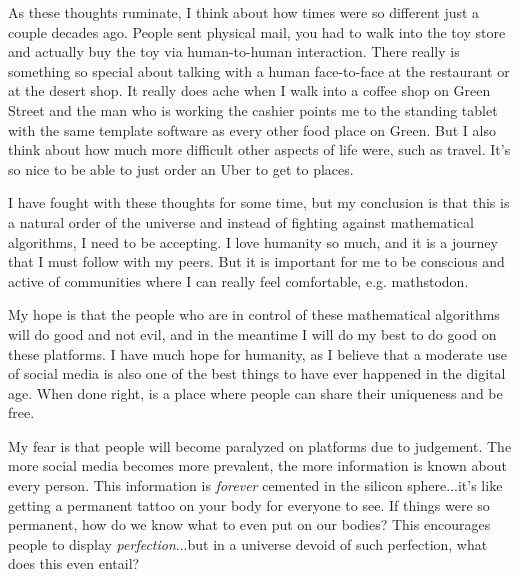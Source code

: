 \documentclass[12pt]{article}
\theoremstyle{definition} %
\theoremstyle{plain} %
\begin{document}
As these thoughts ruminate, I think about how times were so different just a couple decades ago. People sent physical mail, you had to walk into the toy store and actually buy the toy via human-to-human interaction. There really is something so special about talking with a human face-to-face at the restaurant or at the desert shop. It really does ache when I walk into a coffee shop on Green Street and the man who is working the cashier points me to the standing tablet with the same template software as every other food place on Green. But I also think about how much more difficult other aspects of life were, such as travel. It's so nice to be able to just order an Uber to get to places. 

I have fought with these thoughts for some time, but my conclusion is that this is a natural order of the universe and instead of fighting against mathematical algorithms, I need to be accepting. I love humanity so much, and it is a journey that I must follow with my peers. But it is important for me to be conscious and active of communities where I can really feel comfortable, e.g. mathstodon. 

My hope is that the people who are in control of these mathematical algorithms will do good and not evil, and in the meantime I will do my best to do good on these platforms. I have much hope for humanity, as I believe that a moderate use of social media is also one of the best things to have ever happened in the digital age. When done right, is a place where people can share their uniqueness and be free. 

My fear is that people will become paralyzed on platforms due to judgement. The more social media becomes more prevalent, the more information is known about every person. This information is \emph{forever} cemented in the silicon sphere...it's like getting a permanent tattoo on your body for everyone to see. If things were so permanent, how do we know what to even put on our bodies? This encourages people to display \emph{perfection}...but in a universe devoid of such perfection, what does this even entail?
\end{document}
